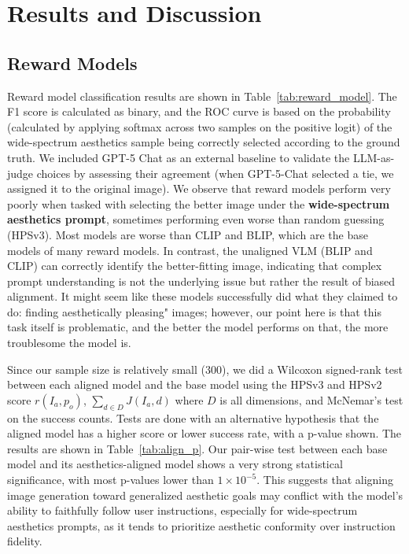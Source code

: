 \section{Results and Discussion}

\subsection{Reward Models}
Reward model classification results are shown in Table~\ref{tab:reward_model}. The F1 score is calculated as binary, and the ROC curve is based on the probability (calculated by applying softmax across two samples on the positive logit) of the wide-spectrum aesthetics sample being correctly selected according to the ground truth. We included GPT-5 Chat as an external baseline to validate the LLM-as-judge choices by assessing their agreement (when GPT-5-Chat selected a tie, we assigned it to the original image). We observe that reward models perform very poorly when tasked with selecting the better image under the \textbf{wide-spectrum aesthetics prompt}, sometimes performing even worse than random guessing (HPSv3). Most models are worse than CLIP and BLIP, which are the base models of many reward models. In contrast, the unaligned VLM (BLIP and CLIP) can correctly identify the better-fitting image, indicating that complex prompt understanding is not the underlying issue but rather the result of biased alignment. It might seem like these models successfully did what they claimed to do: finding aesthetically pleasing" images; however, our point here is that this task itself is problematic, and the better the model performs on that, the more troublesome the model is.

Since our sample size is relatively small (300), we did a Wilcoxon signed-rank test between each aligned model and the base model using the HPSv3 and HPSv2 score $r(I_a, p_o)$, $\sum_{d\in D}J(I_a,d)$ where $D$ is all dimensions, and McNemar's test on the success counts. Tests are done with an alternative hypothesis that the aligned model has a higher score or lower success rate, with a p-value shown. The results are shown in Table~\ref{tab:align_p}. Our pair-wise test between each base model and its aesthetics-aligned model shows a very strong statistical significance, with most p-values lower than $1\times10^{-5}$. This suggests that aligning image generation toward generalized aesthetic goals may conflict with the model’s ability to faithfully follow user instructions, especially for wide-spectrum aesthetics prompts, as it tends to prioritize aesthetic conformity over instruction fidelity.


